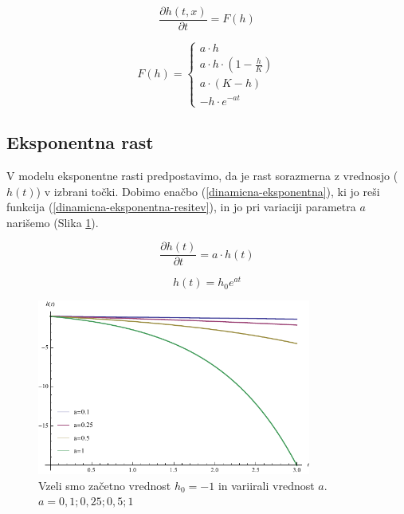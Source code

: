\documentclass[a4paper, oneside, 12pt]{book}
\begin{document}
            \begin{equation}
              \frac{ \partial h(t,x) }{ \partial t} = F(h)
              \label{dinamicna-splosna}
            \end{equation}

          \begin{equation}
            F(h) = \left \{ \begin{array}{lr} 
            a \cdot h \\
            a \cdot h \cdot (1 - \frac{h}{K}) \\
            a \cdot (K - h) \\
            - h \cdot e^{-a t}
            \end{array} \right. 
            \label{dinamicna-variacije}
          \end{equation}

          \subsection{Eksponentna rast}

          V modelu eksponentne rasti predpostavimo, da je rast sorazmerna z vrednosjo ($h(t)$) v izbrani točki. Dobimo enačbo (\ref{dinamicna-eksponentna}), ki jo reši funkcija (\ref{dinamicna-eksponentna-resitev}), in jo pri variaciji parametra $a$ narišemo (Slika \ref{fig:eksponentna-rast}).

          \begin{equation}
            \frac{\partial h(t)}{\partial t} = a \cdot h(t)
            \label{dinamicna-eksponentna}
          \end{equation}

          \begin{equation}
            h(t) = h_0 e^{a t}
            \label{dinamicna-eksponentna-resitev}
          \end{equation}

          \begin{figure}[h]
            \begin{center}
              \includegraphics[width=9cm]{slike/eksponentna-rast}
            \end{center}
            \caption{Vzeli smo začetno vrednost $h_0 = -1$ in variirali vrednost $a$. \newline $a=0,1;0,25;0,5;1$}
            \label{fig:eksponentna-rast}
          \end{figure}
\end{document}

